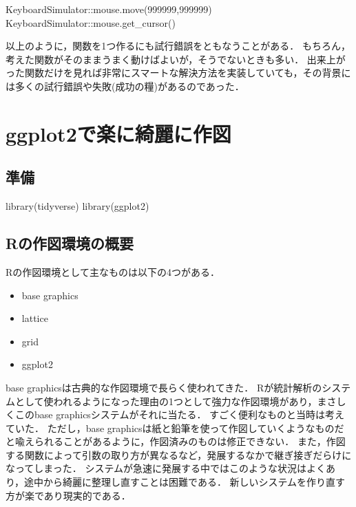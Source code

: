 \documentclass[
]{article}
\newenvironment{Shaded}{\begin{snugshade}}{\end{snugshade}}
\newcommand{\DecValTok}[1]{\textcolor[rgb]{0.00,0.00,0.81}{#1}}
\newcommand{\FunctionTok}[1]{\textcolor[rgb]{0.00,0.00,0.00}{#1}}
\newcommand{\NormalTok}[1]{#1}
\newcommand{\SpecialCharTok}[1]{\textcolor[rgb]{0.00,0.00,0.00}{#1}}
\providecommand{\tightlist}{%
  \setlength{\itemsep}{0pt}\setlength{\parskip}{0pt}}
\begin{document}
\begin{Shaded}
\begin{Highlighting}[]
\NormalTok{KeyboardSimulator}\SpecialCharTok{::}\FunctionTok{mouse.move}\NormalTok{(}\DecValTok{999999}\NormalTok{,}\DecValTok{999999}\NormalTok{)}
\NormalTok{KeyboardSimulator}\SpecialCharTok{::}\FunctionTok{mouse.get\_cursor}\NormalTok{()}
\end{Highlighting}
\end{Shaded}

以上のように，関数を1つ作るにも試行錯誤をともなうことがある．
もちろん，考えた関数がそのままうまく動けばよいが，そうでないときも多い．
出来上がった関数だけを見れば非常にスマートな解決方法を実装していても，その背景には多くの試行錯誤や失敗(成功の糧)があるのであった．

\hypertarget{ggplot2}{%
\section{ggplot2で楽に綺麗に作図}\label{ggplot2}}

\hypertarget{ux6e96ux5099-8}{%
\subsection{準備}\label{ux6e96ux5099-8}}

\begin{Shaded}
\begin{Highlighting}[]
\FunctionTok{library}\NormalTok{(tidyverse)}
\FunctionTok{library}\NormalTok{(ggplot2)}
\end{Highlighting}
\end{Shaded}

\hypertarget{rux306eux4f5cux56f3ux74b0ux5883ux306eux6982ux8981}{%
\subsection{Rの作図環境の概要}\label{rux306eux4f5cux56f3ux74b0ux5883ux306eux6982ux8981}}

Rの作図環境として主なものは以下の4つがある．

\begin{itemize}
\tightlist
\item
  base graphics
\item
  lattice
\item
  grid
\item
  ggplot2
\end{itemize}

base graphicsは古典的な作図環境で長らく使われてきた．
Rが統計解析のシステムとして使われるようになった理由の1つとして強力な作図環境があり，まさしくこのbase graphicsシステムがそれに当たる．
すごく便利なものと当時は考えていた．
ただし，base graphicsは紙と鉛筆を使って作図していくようなものだと喩えられることがあるように，作図済みのものは修正できない．
また，作図する関数によって引数の取り方が異なるなど，発展するなかで継ぎ接ぎだらけになってしまった．
システムが急速に発展する中ではこのような状況はよくあり，途中から綺麗に整理し直すことは困難である．
新しいシステムを作り直す方が楽であり現実的である．
\end{document}
